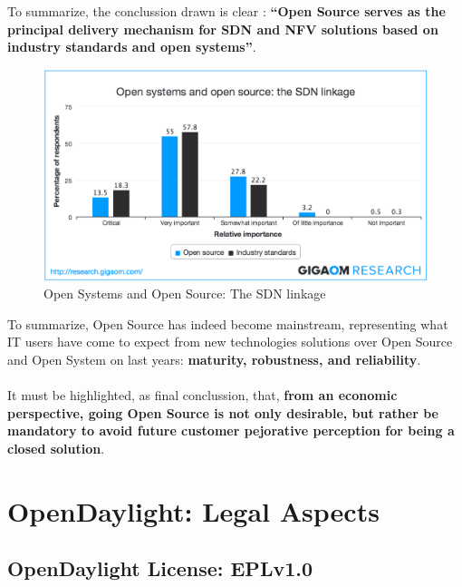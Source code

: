 \documentclass[a4paper, 12pt]{book}
\begin{document}
To summarize, the conclussion drawn is clear : \textbf{``Open Source serves as the principal delivery mechanism for SDN and NFV solutions based on industry standards and open systems''}.
\begin{center}
 \begin{figure}[H]
 \begin{center}
   \includegraphics[width=15cm]{img/open-source-success-operator-view-00.png}
   \caption{Open Systems and Open Source: The SDN linkage}
   \label{fig:sdn_hype_cyle}
 \end{center}
 \end{figure}
\end{center}
To summarize, Open Source has indeed become mainstream, representing what IT users have come to expect from new technologies solutions over Open Source and Open System on last years: \textbf{maturity, robustness, and reliability}.\\
\\
It must be highlighted, as final conclussion, that, \textbf{from an economic perspective, going Open Source is not only desirable, but rather be mandatory to avoid future customer pejorative perception for being a closed solution}.

\chapter{OpenDaylight: Legal Aspects}
\label{chap:odllegal}

\section{OpenDaylight License: EPLv1.0}
\label{sec:odllicense}
\end{document}
